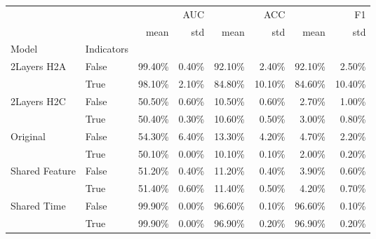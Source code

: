 \begin{tabular}{llrrrrrr}
\toprule
 &  & \multicolumn{2}{r}{AUC} & \multicolumn{2}{r}{ACC} & \multicolumn{2}{r}{F1} \\
 &  & mean & std & mean & std & mean & std \\
Model & Indicators &  &  &  &  &  &  \\
\midrule
\multirow[t]{2}{*}{2Layers H2A} & False & 99.40\% & 0.40\% & 92.10\% & 2.40\% & 92.10\% & 2.50\% \\
 & True & 98.10\% & 2.10\% & 84.80\% & 10.10\% & 84.60\% & 10.40\% \\
\cline{1-8}
\multirow[t]{2}{*}{2Layers H2C} & False & 50.50\% & 0.60\% & 10.50\% & 0.60\% & 2.70\% & 1.00\% \\
 & True & 50.40\% & 0.30\% & 10.60\% & 0.50\% & 3.00\% & 0.80\% \\
\cline{1-8}
\multirow[t]{2}{*}{Original} & False & 54.30\% & 6.40\% & 13.30\% & 4.20\% & 4.70\% & 2.20\% \\
 & True & 50.10\% & 0.00\% & 10.10\% & 0.10\% & 2.00\% & 0.20\% \\
\cline{1-8}
\multirow[t]{2}{*}{Shared Feature} & False & 51.20\% & 0.40\% & 11.20\% & 0.40\% & 3.90\% & 0.60\% \\
 & True & 51.40\% & 0.60\% & 11.40\% & 0.50\% & 4.20\% & 0.70\% \\
\cline{1-8}
\multirow[t]{2}{*}{Shared Time} & False & 99.90\% & 0.00\% & 96.60\% & 0.10\% & 96.60\% & 0.10\% \\
 & True & 99.90\% & 0.00\% & 96.90\% & 0.20\% & 96.90\% & 0.20\% \\
\cline{1-8}
\bottomrule
\end{tabular}
